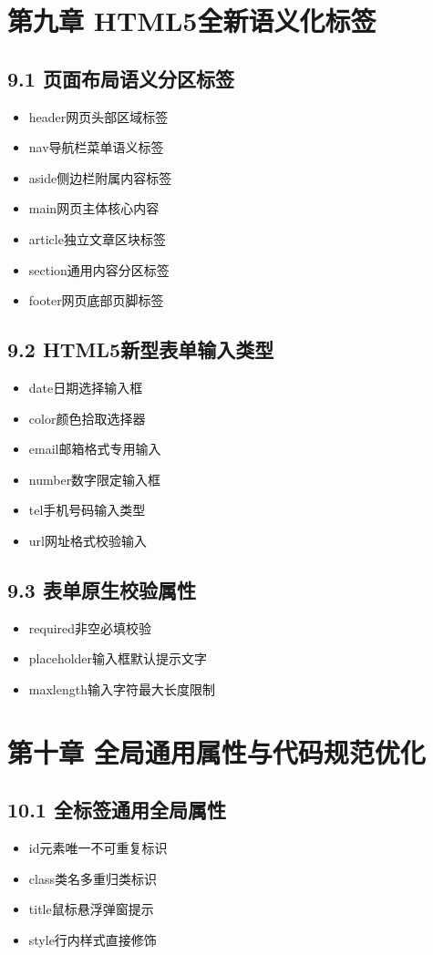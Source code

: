 \section{第九章 HTML5全新语义化标签}
\subsection{9.1 页面布局语义分区标签}
\begin{itemize}[leftmargin=*]
\item header网页头部区域标签
\item nav导航栏菜单语义标签
\item aside侧边栏附属内容标签
\item main网页主体核心内容
\item article独立文章区块标签
\item section通用内容分区标签
\item footer网页底部页脚标签
\end{itemize}

\subsection{9.2 HTML5新型表单输入类型}
\begin{itemize}[leftmargin=*]
\item date日期选择输入框
\item color颜色拾取选择器
\item email邮箱格式专用输入
\item number数字限定输入框
\item tel手机号码输入类型
\item url网址格式校验输入
\end{itemize}

\subsection{9.3 表单原生校验属性}
\begin{itemize}[leftmargin=*]
\item required非空必填校验
\item placeholder输入框默认提示文字
\item maxlength输入字符最大长度限制
\end{itemize}

\section{第十章 全局通用属性与代码规范优化}
\subsection{10.1 全标签通用全局属性}
\begin{itemize}[leftmargin=*]
\item id元素唯一不可重复标识
\item class类名多重归类标识
\item title鼠标悬浮弹窗提示
\item style行内样式直接修饰
\end{itemize}

